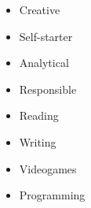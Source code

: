 %
%
%


\threecolumnsection
    {
            \begin{skills}
            \end{skills}
    }
    {
            \vspace{1em}
            \begin{itemize}
                \item Creative
                \item Self-starter
                \item Analytical
                \item Responsible
            \end{itemize}
    }
    {
            \vspace{1em}
            \begin{itemize}
                \item Reading
                \item Writing
                \item Videogames
                \item Programming
            \end{itemize}
    }

